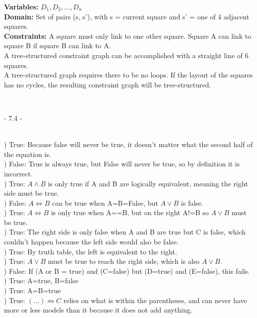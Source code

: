 \documentclass[12pt]{article}
\begin{document}
\noindent \textbf{Variables:} $D_1, D_2, ..., D_n$\\
\textbf{Domain:} Set of pairs (s, s'), with s = current square and s' = one of 4 adjacent squares.\\
\textbf{Constraints:} A square must only link to one other square. Square A can link to square B if square B can link to A. \\

A tree-structured constraint graph can be accomplished with a straight line of 6 squares.\\

A tree-structured graph requires there to be no loops. If the layout of the squares has no cycles, the resulting constraint graph will be tree-structured.



\noindent \hrulefill \\



\centerline{- 7.4 - }
\ \\
) True: Because false will never be true, it doesn't matter what the second half of the equation is.\\[.4em]
) False: True is always true, but False will never be true, so by definition it is incorrect.\\[.4em]
) True: $A\wedge B$ is only true if A and B are logically equivalent, meaning the right side must be true.\\[.4em]
) False: $A\Leftrightarrow B$ can be true when A=B=False, but $A\vee B$ is false.\\[.4em]
) True:  $A\Leftrightarrow B$ is only true when A==B, but on the right A!=B so $A\vee B$ must be true.\\[.4em]
) True: The right side is only false when A and B are true but C is false, which couldn't happen because the left side would also be false.\\[.4em]
) True: By truth table, the left is equivalent to the right.\\[.4em]
) True: $A\vee B$ must be true to reach the right side, which is also $A\vee B$.\\[.4em]
) False: If (A or B = true) and (C=false) but (D=true) and (E=false), this fails.\\[.4em]
) True: A=true, B=false\\[.4em]
) True: A=B=true\\[.4em]
) True: $(...)\Leftrightarrow C$ relies on what is within the parentheses, and can never have more or less models than it because it does not add anything.
\end{document}
